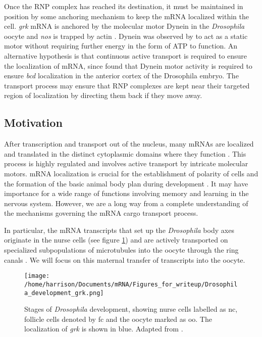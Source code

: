 \documentclass[twocolumn]{biophys}
\begin{document}
Once the RNP complex has reached its destination, it must be maintained in position by some anchoring mechanism to keep the mRNA localized within the cell.
\textit{grk} mRNA is anchored by the molecular motor Dynein \citep{delanoue2005dynein} in the \textit{Drosophila} oocyte and \textit{nos} is trapped by actin \citep{forrest2003live}.
Dynein was observed by \citet{delanoue2005dynein} to act as a static motor without requiring further energy in the form of ATP to function. 
An alternative hypothesis is that continuous active transport is required to ensure the localization of mRNA, since \citet{weil2006localization} found that Dynein motor activity is required to ensure \textit{bcd} localization in the anterior cortex of the Drosophila embryo.
The transport process may ensure that RNP complexes are kept near their targeted region of localization by directing them back if they move away.

\subsection{Motivation}
After transcription and transport out of the nucleus, many mRNAs are localized and translated in the distinct cytoplasmic domains where they function \citep{jansen2001mrna, parton2014subcellular}.
This process is highly regulated and involves active transport by intricate molecular motors.
mRNA localization is crucial for the establishment of polarity of cells and the formation of the basic animal body plan during development \citep{wolpert1998}. 
It may have importance for a wide range of functions involving memory and learning in the nervous system. 
However, we are a long way from a complete understanding of the mechanisms governing the mRNA cargo transport process.

In particular, the mRNA transcripts that set up the \textit{Drosophila} body axes originate in the nurse cells (see figure \ref{FIG:Drosophila_development}) and are actively transported on specialized subpopulations of microtubules into the oocyte through the ring canals \citep{clark2007dynein}.
We will focus on this maternal transfer of transcripts into the oocyte.
\begin{figure}[h]
 \centering
 \texttt{[image: /home/harrison/Documents/mRNA/Figures\_for\_writeup/Drosophila\_development\_grk.png]}
 \caption{Stages of \textit{Drosophila} development, showing nurse cells labelled as nc, follicle cells denoted by fc and the oocyte marked as oo. The localization of \textit{grk} is shown in blue. Adapted from \citet{lasko1999rna}.}
 \label{FIG:Drosophila_development}
\end{figure}
\end{document}

